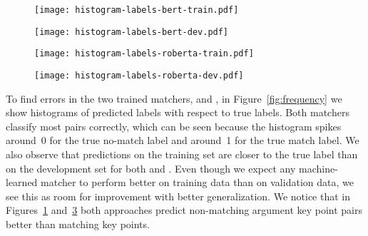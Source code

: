 \begin{figure*}
    \centering
    \begin{subfigure}{0.485\textwidth}
        \centering
        \texttt{[image: histogram-labels-bert-train.pdf]}
        \label{subfig:bert_train}
    \end{subfigure}
    \hfill
    \begin{subfigure}{0.485\textwidth}
        \centering
        \texttt{[image: histogram-labels-bert-dev.pdf]}
        \label{subfig:bert_dev}
    \end{subfigure}
    \begin{subfigure}{0.485\textwidth}
        \centering
        \texttt{[image: histogram-labels-roberta-train.pdf]}
        \label{subfig:roberta_train}
    \end{subfigure}
    \hfill
    \begin{subfigure}{0.485\textwidth}
        \centering
        \texttt{[image: histogram-labels-roberta-dev.pdf]}
        \label{subfig:roberta_dev}
    \end{subfigure}
    \caption{Histograms of predicted labels on the training and validation sets for argument key point pairs with the \BertBase and \RobertaBase classifiers. For good classifiers, predicted labels should approximately equal the true label~(0~or~1).}
    \label{fig:frequency}
\end{figure*}
To find errors in the two trained matchers, \BertBase and \RobertaBase, in Figure~\ref{fig:frequency} we show histograms of predicted labels with respect to true labels.
Both matchers classify most pairs correctly, which can be seen because the histogram spikes around~0 for the true no-match label and around~1 for the true match label.
We also observe that predictions on the training set are closer to the true label than on the development set for both \RobertaBase and \BertBase.
Even though we expect any machine-learned matcher to perform better on training data than on validation data, we see this as room for improvement with better generalization.
We notice that in Figures~\ref{subfig:bert_train} and~\ref{subfig:roberta_train} both approaches predict non-matching argument key point pairs better than matching key points.
